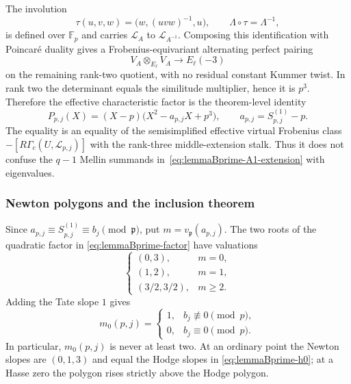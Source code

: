 The involution
\begin{equation}
 \tau(u,v,w)=\bigl(w,(uvw)^{-1},u\bigr),\qquad
 \Lambda\circ\tau=\Lambda^{-1},
 \label{eq:lemmaBprime-involution}
\end{equation}
is defined over $\mathbb F_p$ and carries $\mathcal L_A$ to
$\mathcal L_{A^{-1}}$.  Composing this identification with Poincar\'e
duality gives a Frobenius-equivariant alternating perfect pairing
\[
 V_A\otimes_{E_\ell}V_A\longrightarrow E_\ell(-3)
\]
on the remaining rank-two quotient, with no residual constant Kummer twist.
In rank two the determinant equals the similitude multiplier, hence it is
$p^3$.  Therefore the effective characteristic factor is
the theorem-level identity
\begin{equation}
 \boxed{
 P_{p,j}(X)=(X-p)\bigl(X^2-a_{p,j}X+p^3\bigr),
 \qquad
 a_{p,j}=S_{p,j}^{(1)}-p.}
 \label{eq:lemmaBprime-factor}
\end{equation}
The equality is an equality of the semisimplified effective virtual
Frobenius class $-[R\Gamma_c(U,\mathcal L_{p,j})]$ with the rank-three
middle-extension stalk.  Thus it does not confuse the $q-1$ Mellin
summands in~\eqref{eq:lemmaBprime-A1-extension} with eigenvalues.

\subsubsection{Newton polygons and the inclusion theorem}

Since $a_{p,j}\equiv S_{p,j}^{(1)}\equiv b_j\pmod{\mathfrak p}$, put
$m=v_{\mathfrak p}(a_{p,j})$.  The two roots of the quadratic factor in
\eqref{eq:lemmaBprime-factor} have valuations
\begin{equation}
 \begin{cases}
 (0,3),&m=0,\\
 (1,2),&m=1,\\
 (3/2,3/2),&m\geq2.
 \end{cases}
 \label{eq:lemmaBprime-quadratic-slopes}
\end{equation}
Adding the Tate slope $1$ gives
\begin{equation}
 m_0(p,j)=
 \begin{cases}
 1,&b_j\not\equiv0\pmod p,\\
 0,&b_j\equiv0\pmod p.
 \end{cases}
 \label{eq:lemmaBprime-unit-count}
\end{equation}
In particular, $m_0(p,j)$ is never at least two.  At an ordinary point the
Newton slopes are $(0,1,3)$ and equal the Hodge slopes in
\eqref{eq:lemmaBprime-h0}; at a Hasse zero the polygon rises strictly above
the Hodge polygon.

